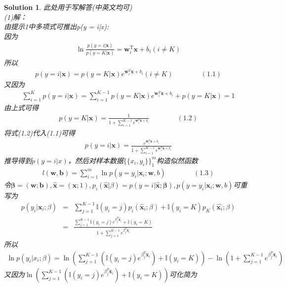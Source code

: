 \documentclass[a4paper,UTF8]{article}
\numberwithin{equation}{section}
\newtheorem*{solution}{Solution}
\begin{document}
\begin{solution}
此处用于写解答(中英文均可)\\
(1)解：\\
由提示1中多项式可推出p(y = i|x):\\
因为
\begin{eqnarray*}
	\ln\frac{p(y=i|\mathbf{x})}{p(y=K|\mathbf{x})}=\mathbf{w}_i^\mathrm{T}\mathbf{x}+b_i(i \neq K)
\end{eqnarray*}
所以
\begin{eqnarray*}
	p(y=i|\mathbf{x})=p(y=K|\mathbf{x})e^{\mathbf{w}_i^T\mathbf{x}+b_i}(i \neq K)\qquad\qquad(1.1)
\end{eqnarray*}
又因为
\begin{eqnarray*}
	\sum^K_{i=1}p(y=i|\mathbf{x})=\sum^{K-1}_{i=1}p(y=K|\mathbf{x})e^{\mathbf{w}_i^T\mathbf{x}+b_i}+p(y=K|\mathbf{x})=1
\end{eqnarray*}
由上式可得
\begin{eqnarray*}
	p(y=K|\mathbf{x})=\frac{1}{1+\sum^{K-1}_{i=1}e^{\mathbf{w}^T_i\mathbf{x}+b_i}}\qquad\qquad(1.2)
\end{eqnarray*}
将式(1.2)代入(1.1)可得
\begin{eqnarray*}
	p(y=i|\mathbf{x})=\frac{e^{\mathbf{w}_i^T\mathbf{x}+b_i}}{1+\sum^{K-1}_{i=1}e^{\mathbf{w}^T_i\mathbf{x}+b_i}}
\end{eqnarray*}
推导得到$p(y=i|x)$，然后对样本数据$\{\{x_i,y_i\}\}^m_1$构造似然函数
\begin{eqnarray*}
	l(\mathbf{w},\mathbf{b})=\sum^m_{i=1}\ln p(y=y_i|\mathbf{x}_i;\mathbf{w},b)\qquad\qquad(1.3)
\end{eqnarray*}
令$\mathbf{\beta}=(\mathbf{w};\mathbf{b}),\hat{\mathbf{x}}=(\mathbf{x};1),p_i(\hat{\mathbf{x}}|\beta)=p(y=i|\hat{\mathbf{x}};\mathbf{\beta}),p(y=y_i|\mathbf{x}_i;\mathbf{w},b)$可重写为
\begin{eqnarray*}
	p(y_i|\mathbf{x}_i;\beta)&=&\sum^{K-1}_{j=1}\mathbb{I}(y_i=j)p_i(\hat{\mathbf{x}}_i;\beta)+\mathbb{I}(y_i=K)p_K(\hat{\mathbf{x}_i};\beta)\\
	&=&\frac{\sum^{K-1}_{j=1}\mathbb{I}(y_i=j)e^{\beta^T_j\hat{\mathbf{x}}_i}+\mathbb{I}(y_i=K)}{1+\sum^{K-1}_{j=1}e^{\beta^T_j\hat{\mathbf{x}}_i}}
\end{eqnarray*}
所以
\begin{eqnarray*}
	\ln p(y_i|x_i;\beta)=\ln(\sum^{K-1}_{j=1}(\mathbb{I}(y_i=j)e^{\beta^T_j\hat{\mathbf{x}}_i})+\mathbb{I}(y_i=K))-\ln(1+\sum^{K-1}_{j=1}e^{\beta^T_j\hat{\mathbf{x}}_i})
\end{eqnarray*}
又因为$\ln(\sum^{K-1}_{j=1}(\mathbb{I}(y_i=j)e^{\beta^T_j\hat{\mathbf{x}}_i})+\mathbb{I}(y_i=K))$可化简为

\end{solution}
\end{document}
